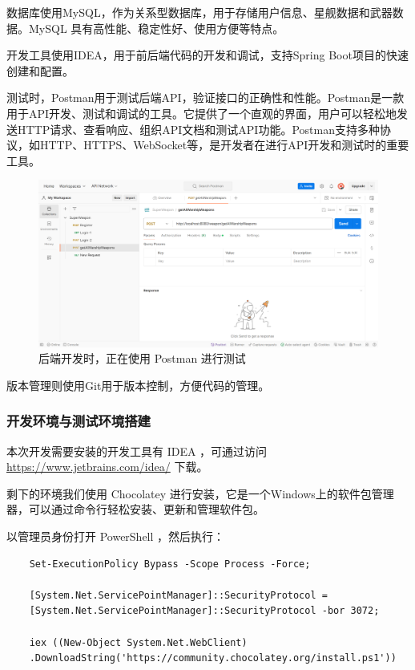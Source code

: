 \documentclass{base}
\begin{document}
数据库使用MySQL，作为关系型数据库，用于存储用户信息、星舰数据和武器数据。MySQL 具有高性能、稳定性好、使用方便等特点。

开发工具使用IDEA，用于前后端代码的开发和调试，支持Spring Boot项目的快速创建和配置。

测试时，Postman用于测试后端API，验证接口的正确性和性能。Postman是一款用于API开发、测试和调试的工具。它提供了一个直观的界面，用户可以轻松地发送HTTP请求、查看响应、组织API文档和测试API功能。Postman支持多种协议，如HTTP、HTTPS、WebSocket等，是开发者在进行API开发和测试时的重要工具。

\begin{figure}[H]
	\centering
	\includegraphics[width=\linewidth]{images/postman.png}
	\caption{后端开发时，正在使用 Postman 进行测试}
	\label{fig:}
\end{figure}

版本管理则使用Git用于版本控制，方便代码的管理。

\subsubsection{开发环境与测试环境搭建}

本次开发需要安装的开发工具有 IDEA ，可通过访问 \url{https://www.jetbrains.com/idea/} 下载。

剩下的环境我们使用 Chocolatey 进行安装，它是一个Windows上的软件包管理器，可以通过命令行轻松安装、更新和管理软件包。

以管理员身份打开 PowerShell ，然后执行：
\begin{verbatim}
	Set-ExecutionPolicy Bypass -Scope Process -Force;
	
	[System.Net.ServicePointManager]::SecurityProtocol = 
	[System.Net.ServicePointManager]::SecurityProtocol -bor 3072; 
	
	iex ((New-Object System.Net.WebClient)
	.DownloadString('https://community.chocolatey.org/install.ps1'))
\end{verbatim}
\end{document}
